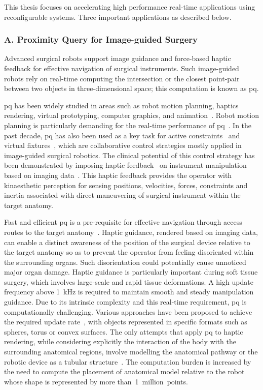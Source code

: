 This thesis focuses on accelerating high performance real-time applications using reconfigurable systems. Three important applications as described below.

\subsubsection{A. Proximity Query for Image-guided Surgery}

Advanced surgical robots support image guidance and force-based haptic feedback for effective navigation of surgical instruments. 
Such image-guided robots rely on real-time computing the intersection or the closest point-pair
between two objects in three-dimensional space; 
this computation is known as \gls{pq}.

\gls{pq} has been widely studied in areas such as robot motion planning, haptics rendering, virtual prototyping, computer graphics, and animation~\cite{gilbert90}.
Robot motion planning is particularly demanding for the real-time performance of \gls{pq}~\cite{chakraborty08}. 
In the past decade, \gls{pq} has also been used as a key task for active constraints~\cite{kwok10} and virtual fixtures~\cite{li07}, which are collaborative control strategies mostly applied in image-guided surgical robotics. 
The clinical potential of this control strategy has been demonstrated by imposing haptic feedback~\cite{constantinescu05} on instrument manipulation based on imaging data~\cite{jakopec03}.
This haptic feedback provides the operator with kinaesthetic perception for sensing positions, velocities, forces, constraints and inertia associated with direct maneuvering of surgical
instrument within the target anatomy.

Fast and efficient \gls{pq} is a pre-requisite for effective navigation through access routes to the target anatomy~\cite{kwok10}.
Haptic guidance, rendered based on imaging data, can enable a distinct awareness of the position of the surgical device relative to the target anatomy so as to prevent the operator from feeling disoriented within the surrounding organs. 
Such disorientation could potentially cause unnoticed major organ damage. 
Haptic guidance is particularly important during soft tissue surgery, which involves large-scale and rapid tissue deformations. 
A high update frequency above 1~kHz is required to maintain smooth and steady manipulation guidance. 
Due to its intrinsic complexity and this real-time requirement, \gls{pq} is computationally challenging.
Various approaches have been proposed to achieve the required update rate~\cite{benallegue09,chakraborty08}, 
with objects represented in specific formats such as spheres, torus or convex surfaces.
The only attempts that apply \gls{pq} to haptic rendering, while considering explicitly the interaction of the body with the surrounding anatomical regions, involve modelling the anatomical pathway or the robotic device as a tubular structure~\cite{li07,kwok13}.
The computation burden is increased by the need to compute the placement of anatomical model relative to the robot whose shape is represented by more than~1~million~points.

